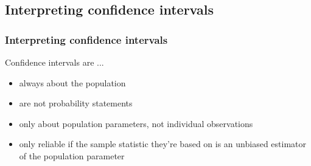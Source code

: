 
\subsection{Interpreting confidence intervals}


\begin{frame}
\frametitle{Interpreting confidence intervals}

Confidence intervals are ...

\begin{itemize}

\item always about the population

\item are not probability statements 

\item only about population parameters, not individual observations

\item only reliable if the sample statistic they're based on is an unbiased estimator of the population parameter

\end{itemize}

\end{frame}

